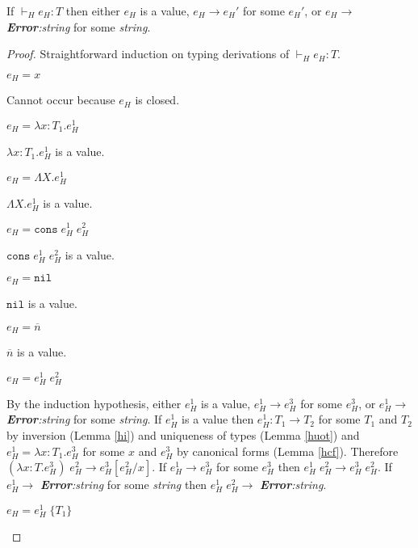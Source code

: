 \begin{hps}
\label{hps}
If $\vdash_{H}e_{H}:T$ then either $e_{H}$ is a value, $e_{H}\rightarrow e_{H}'$ for some $e_{H}'$, or $e_{H}\rightarrow$ \emph{\textbf{Error}:\;string} for some \emph{string}.



\begin{proof}
Straightforward induction on typing derivations of $\vdash_{H}e_{H}:T$.
\begin{hps-case-1}
$e_{H}=x$

Cannot occur because $e_{H}$ is closed.
\end{hps-case-1}
\begin{hps-case-2}
$e_{H}=\lambda x:T_{1}.e_{H}^{1}$

$\lambda x:T_{1}.e_{H}^{1}$ is a value.
\end{hps-case-2}
\begin{hps-case-3}
$e_{H}=\Lambda X.e_{H}^{1}$

$\Lambda X.e_{H}^{1}$ is a value.
\end{hps-case-3}
\begin{hps-case-4}
$e_{H}=\mathtt{cons}\;e_{H}^{1}\;e_{H}^{2}$

$\mathtt{cons}\;e_{H}^{1}\;e_{H}^{2}$ is a value.
\end{hps-case-4}
\begin{hps-case-5}
$e_{H}=\mathtt{nil}$

$\mathtt{nil}$ is a value.
\end{hps-case-5}
\begin{hps-case-6}
$e_{H}=\overline{n}$

$\overline{n}$ is a value.
\end{hps-case-6}
\begin{hps-case-7}
$e_{H}=e_{H}^{1}\;e_{H}^{2}$

By the induction hypothesis, either $e_{H}^{1}$ is a value, $e_{H}^{1}\rightarrow e_{H}^{3}$ for some $e_{H}^{3}$, or $e_{H}^{1}\rightarrow$ \emph{\textbf{Error}:\;string} for some \emph{string}.  If $e_{H}^{1}$ is a value then $e_{H}^{1}:T_{1}\rightarrow T_{2}$ for some $T_{1}$ and $T_{2}$ by inversion (Lemma \ref{hi}) and uniqueness of types (Lemma \ref{huot}) and $e_{H}^{1}=\lambda x:T_{1}.e_{H}^{3}$ for some $x$ and $e_{H}^{3}$ by canonical forms (Lemma \ref{hcf}).  Therefore $(\lambda x:T.e_{H}^{3})\;e_{H}^{2}\rightarrow e_{H}^{3}[e_{H}^{2}/x]$.  If $e_{H}^{1}\rightarrow e_{H}^{3}$ for some $e_{H}^{3}$ then $e_{H}^{1}\;e_{H}^{2}\rightarrow e_{H}^{3}\;e_{H}^{2}$.  If $e_{H}^{1}\rightarrow$ \emph{\textbf{Error}:\;string} for some \emph{string} then $e_{H}^{1}\;e_{H}^{2}\rightarrow$ \emph{\textbf{Error}:\;string}.
\end{hps-case-7}
\begin{hps-case-8}
$e_{H}=e_{H}^{1}\;\lbrace T_{1}\rbrace$


\end{hps-case-8}
\end{proof}
\end{hps}
